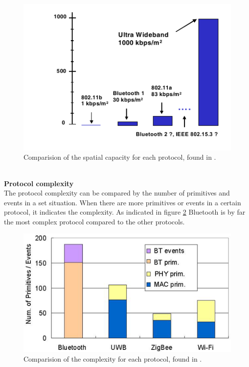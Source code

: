 \documentclass[10pt,a4paper]{article}
\begin{document}
\begin{figure}[H]
   \centering
   \includegraphics[width=1\textwidth]{spatialcapacity}
   \caption{Comparision of the spatial capacity for each protocol, found in \cite{ultrawidebandshortmediumrange}.}
   \label{fig:protocolcomplexity}
\end{figure}

\textbf{\\Protocol complexity}\\
The protocol complexity can be compared by the number of primitives and events in a set situation. When there are more primitives or events in a certain protocol, it indicates the complexity. \cite{comparitivestudywirelessprotocols} As indicated in figure \ref{fig:protocolcomplexity} Bluetooth is by far the most complex protocol compared to the other protocols.

\begin{figure}[H]
   \centering
   \includegraphics[width=1\textwidth]{protocolcomplexity}
   \caption{Comparision of the complexity for each protocol, found in \cite{comparitivestudywirelessprotocols}.}
   \label{fig:protocolcomplexity}
\end{figure}
\end{document}
